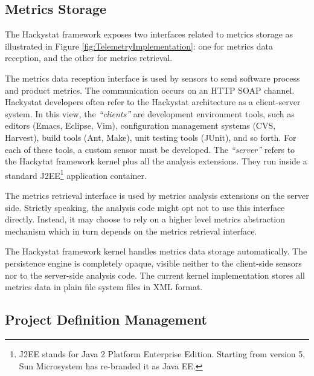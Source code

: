 \subsection{Metrics Storage}

The Hackystat framework exposes two interfaces related to metrics storage as illustrated in Figure \ref{fig:TelemetryImplementation}: one for metrics data reception, and the other for metrics retrieval.

The metrics data reception interface is used by sensors to send software process and product metrics. The communication occurs on an HTTP SOAP channel. Hackystat developers often refer to the Hackystat architecture as a client-server system. In this view, the \textit{``clients''} are development environment tools, such as editors (Emacs, Eclipse, Vim), configuration management systems (CVS, Harvest), build tools (Ant, Make), unit testing tools (JUnit), and so forth. For each of these tools, a custom sensor must be developed. The \textit{``server''} refers to the Hackytat framework kernel plus all the analysis extensions. They run inside a standard J2EE\footnote{J2EE stands for Java 2 Platform Enterprise Edition. Starting from version 5, Sun Microsystem has re-branded it as Java EE.} application container.

The metrics retrieval interface is used by metrics analysis extensions on the server side. Strictly speaking, the analysis code might opt not to use this interface directly. Instead, it may choose to rely on a higher level metrics abstraction mechanism which in turn depends on the metrics retrieval interface.

The Hackystat framework kernel handles metrics data storage automatically. The persistence engine is completely opaque, visible neither to the client-side sensors nor to the server-side analysis code. The current kernel implementation stores all metrics data in plain file system files in XML format. 



\subsection{Project Definition Management} 

